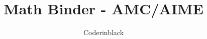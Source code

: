 

\title{\textbf{Math Binder - AMC/AIME}}
\author{Coderinblack}


  \maketitle

  \tableofcontents

  \newpage

  
  
  

